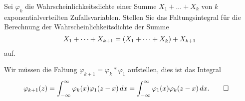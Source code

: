 Sei $\varphi_k$ die Wahrscheinlichkeitsdichte einer Summe
$X_1+\dots+X_k$ von $k$ exponentialverteilten Zufallsvariablen.
Stellen Sie das Faltungsintegral für die Berechnung der
Wahrscheinlichkeitsdichte der Summe
\[
X_1+\dots+X_{k+1}
=
(X_1+\dots+X_{k\mathstrut}) + X_{k+1}
\]
auf.

\begin{loesung}
Wir müssen die Faltung $\varphi_{k+1}=\varphi_k * \varphi_1$ aufstellen,
dies ist das Integral
\begin{align*}
\varphi_{k+1}(z)
&=
\int_{-\infty}^\infty
\varphi_k(x) \varphi_{1}(z-x)\,dx
=
\int_{-\infty}^\infty
\varphi_1(x) \varphi_{k}(z-x)\,dx
.
\qedhere
\end{align*}
\end{loesung}

